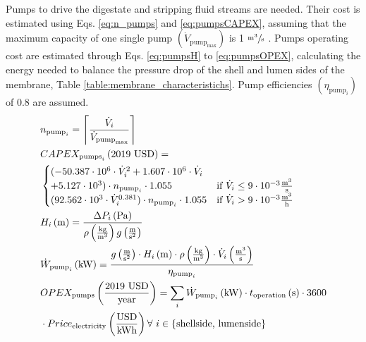 \begin{refsection}[referencesApD]
Pumps to drive the digestate and stripping fluid streams are needed. Their cost is estimated using Eqs. \ref{eq:n_pumps} and \ref{eq:pumpsCAPEX}, assuming that the maximum capacity of one single pump $\left(\dot{V}_{\text{pump}_{\text{max}}}\right)$ is 1 $\sfrac{\text{m}^3}{\text{s}}$ \citep{peters2003plant}. Pumps operating cost are estimated through Eqs. \ref{eq:pumpsH} to \ref{eq:pumpsOPEX}, calculating the energy needed to balance the pressure drop of the shell and lumen sides of the membrane, Table \ref{table:membrane_characteristichs}. Pump efficiencies $\left(\eta_{\text{pump}_i}\right)$ of 0.8 are assumed.
\begin{align}	
&
n_{\text{pump}_i} = \ceil*{\frac{\dot{V}_i}{\dot{V}_{\text{pump}_{\text{max}}}}} \label{eq:n_pumps}
\\
& CAPEX_{\text{pumps}_i} \left(\text{2019 USD}\right) = \nonumber \\
&
\begin{cases}
(-50.387\cdot10^6 \cdot \dot{V}_i^2 + 1.607\cdot10^6 \cdot \dot{V}_i 
\\
+ 5.127\cdot10^3) \cdot n_{\text{pump}_i} \cdot 1.055 & \text{if } \dot{V}_i \leq 9\cdot10^{-3} \frac{\text{m}^3}{\text{s}}  \\
(92.562\cdot10^3\cdot \dot{V}_i^{0.381}) \cdot n_{\text{pump}_i} \cdot 1.055 & \text{if }  \dot{V}_i > 9\cdot10^{-3} \frac{\text{m}^3}{\text{h}}
\end{cases} \label{eq:pumpsCAPEX} \\ 
& H_i \left(\text{m}\right) = \frac{\Delta P_i \left(\text{Pa}\right)}{\rho \left(\frac{\text{kg}}{\text{m}^3}\right) g\left(\frac{\text{m}}{\text{s}^2}\right)} \label{eq:pumpsH}
\\
& \dot{W}_{\text{pump}_i} \left(\text{kW}\right) = \frac{g\left(\frac{\text{m}}{\text{s}^2}\right) \cdot H_i \left(\text{m}\right) \cdot \rho \left(\frac{\text{kg}}{\text{m}^3}\right) \cdot \dot{V}_i \left(\frac{\text{m}^3}{\text{s}}\right)}{\eta_{\text{pump}_i}} \label{eq:pumpsPower}
\\
& OPEX_{\text{pumps}} \left(\frac{\text{2019 USD}}{\text{year}}\right) = \sum_{i} \dot{W}_{\text{pump}_i} \left(\text{kW}\right) \cdot t_{\text{operation}} \left(\text{s}\right) \cdot 3600 \nonumber \\
& \cdot Price_{\text{electricity}}\left(\frac{\text{USD}}{\text{kWh}}\right) \forall \ i  \in \{\text{shellside, lumenside}\} \label{eq:pumpsOPEX} 
\end{align}


\end{refsection}
